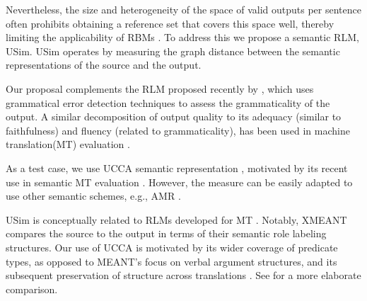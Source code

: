 \documentclass[a4paper, 11pt]{article}
\newcommand{\lc}[1]{\footnote{\color{blue}LC: #1}}
\begin{document}
Nevertheless, the size and heterogeneity of the space of valid outputs per sentence often prohibits
obtaining a reference set that covers this space well, thereby limiting the applicability
of RBMs \cite{bryant2015far}.
To address this we propose a semantic RLM, {\sc USim}.
{\sc USim} operates by measuring the graph distance between the semantic
representations of the source and the output.

Our proposal complements the RLM proposed recently by 
, which uses grammatical error detection techniques to assess the grammaticality of the output.
A similar decomposition of output quality to its adequacy (similar to faithfulness)
and fluency (related to grammaticality), has been used in machine translation(MT)
evaluation \cite[e.g.,][]{banchs2015adequacy}.

As a test case, we use UCCA semantic representation \cite{abend2013universal},
motivated by its recent use in semantic MT evaluation \cite{birch2016hume}.
However, the measure can be easily adapted to use other semantic schemes, e.g., AMR \cite{banarescu-EtAl:2013:LAW7-ID}.

{\sc USim} is conceptually related to RLMs developed
for MT
\cite{reeder2006measuring,albrecht2007regression,specia2009estimating,specia2010machine}.
Notably, XMEANT \cite{lo2014xmeant} compares the source to the output
in terms of their semantic role labeling structures.
Our use of UCCA is motivated by its wider coverage of predicate types, as opposed to 
MEANT's focus on verbal argument structures, and its subsequent preservation
of structure across translations \cite{sulem2015conceptual}.
See \cite{birch2016hume} for a more elaborate comparison. 



\end{document}
